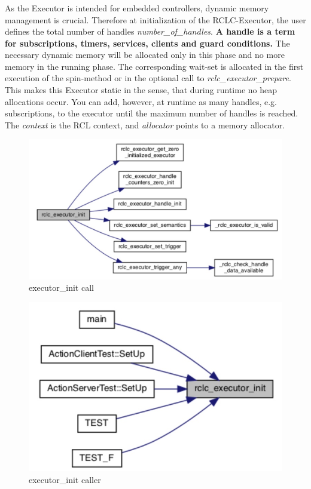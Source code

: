 \subsubsection{}
As the Executor is intended for embedded controllers, dynamic memory management is crucial. Therefore at initialization of the RCLC-Executor, the user defines the total number of handles \textit{number\_of\_handles}. \textbf{A handle is a term for subscriptions, timers, services, clients and guard conditions.} The necessary dynamic memory will be allocated only in this phase and no more memory in the running phase. The corresponding wait-set is allocated in the first execution of the spin-method or in the optional call to \textit{rclc\_executor\_prepare}. This makes this Executor static in the sense, that during runtime no heap allocations occur. You can add, however, at runtime as many handles, e.g. subscriptions, to the executor until the maximum number of handles is reached. The \textit{context} is the RCL context, and \textit{allocator} points to a memory allocator.
\begin{figure}[htb!]
    \centering
    \includegraphics[width=0.95\linewidth]{Img/graph/rclc/executor_init.jpg}
    \caption{executor\_init call}
    \vspace{-0.1in}
\end{figure}

\begin{figure}[htb!]
    \centering
    \includegraphics[width=0.75\linewidth]{Img/graph/rclc/executor_init_caller.jpg}
    \caption{executor\_init caller}
    \vspace{-0.1in}
\end{figure}


